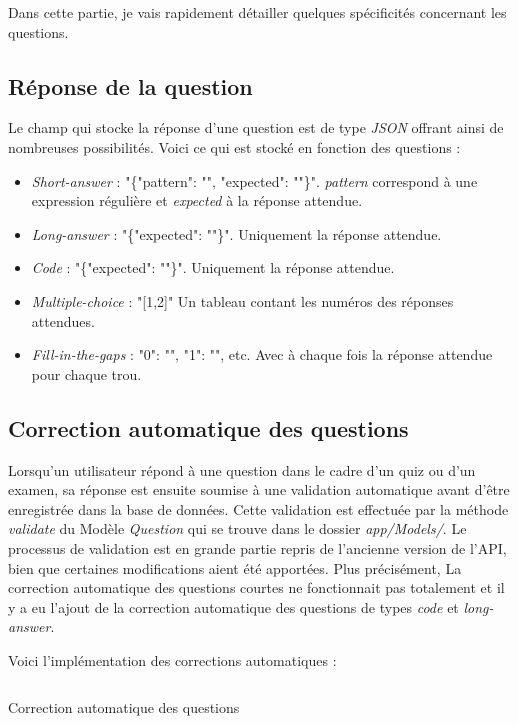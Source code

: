 Dans cette partie, je vais rapidement détailler quelques spécificités concernant les questions.

\subsection{Réponse de la question}
Le champ qui stocke la réponse d'une question est de type \emph{JSON} offrant ainsi de nombreuses possibilités. Voici ce qui est stocké en fonction des questions :
\begin{itemize}
    \item \emph{Short-answer} : "\{"pattern": "", "expected": ""\}". \emph{pattern} correspond à une expression régulière et \emph{expected} à la réponse attendue.
    \item \emph{Long-answer} : "\{"expected": ""\}". Uniquement la réponse attendue.
    \item \emph{Code} : "\{"expected": ""\}". Uniquement la réponse attendue.
    \item \emph{Multiple-choice} : "[1,2]" Un tableau contant les numéros des réponses attendues.
    \item \emph{Fill-in-the-gaps} : {"0": "", "1": "", etc.} Avec à chaque fois la réponse attendue pour chaque trou.
\end{itemize}

\subsection{Correction automatique des questions}
Lorsqu'un utilisateur répond à une question dans le cadre d'un quiz ou d'un examen, sa réponse est ensuite soumise à une validation automatique avant d'être enregistrée dans la base de données. Cette validation est effectuée par la méthode \emph{validate} du Modèle \emph{Question} qui se trouve dans le dossier \emph{app/Models/}. Le processus de validation est en grande partie repris de l'ancienne version de l'API, bien que certaines modifications aient été apportées. Plus précisément, La correction automatique des questions courtes ne fonctionnait pas totalement et il y a eu l'ajout de la correction automatique des questions de types \emph{code} et \emph{long-answer}.

Voici l'implémentation des corrections automatiques :

\begin{listing}[H]
    \inputminted{php}{assets/code/questionValidation.php}
    \caption{Correction automatique des questions}
\end{listing}


